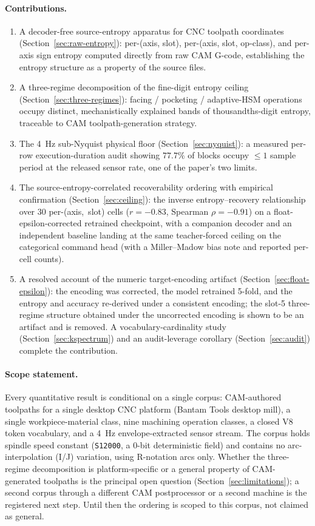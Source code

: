 \documentclass[entropy,article,submit,moreauthors,pdftex]{Definitions/mdpi}
\begin{document}
\paragraph{Contributions.}
\begin{enumerate}[label=\textbf{(\arabic*)}, leftmargin=*]
\item A decoder-free source-entropy apparatus for CNC toolpath coordinates (Section~\ref{sec:raw-entropy}): per-(axis, slot), per-(axis, slot, op-class), and per-axis sign entropy computed directly from raw CAM G-code, establishing the entropy structure as a property of the source files.
\item A three-regime decomposition of the fine-digit entropy ceiling (Section~\ref{sec:three-regimes}): facing / pocketing / adaptive-HSM operations occupy distinct, mechanistically explained bands of thousandths-digit entropy, traceable to CAM toolpath-generation strategy.
\item The 4~Hz sub-Nyquist physical floor (Section~\ref{sec:nyquist}): a measured per-row execution-duration audit showing $77.7\%$ of blocks occupy $\le\!1$ sample period at the released sensor rate, one of the paper's two limits.
\item The source-entropy-correlated recoverability ordering with empirical confirmation (Section~\ref{sec:ceiling}): the inverse entropy--recovery relationship over $30$ per-(axis,~slot) cells ($r=-0.83$, Spearman $\rho=-0.91$) on a float-epsilon-corrected retrained checkpoint, with a companion decoder and an independent baseline landing at the same teacher-forced ceiling on the categorical command head (with a Miller--Madow bias note and reported per-cell counts).
\item A resolved account of the numeric target-encoding artifact (Section~\ref{sec:float-epsilon}): the encoding was corrected, the model retrained 5-fold, and the entropy and accuracy re-derived under a consistent encoding; the slot-5 three-regime structure obtained under the uncorrected encoding is shown to be an artifact and is removed. A vocabulary-cardinality study (Section~\ref{sec:kspectrum}) and an audit-leverage corollary (Section~\ref{sec:audit}) complete the contribution.
\end{enumerate}

\paragraph{Scope statement.} Every quantitative result is conditional on a single corpus: CAM-authored toolpaths for a single desktop CNC platform (Bantam Tools desktop mill), a single workpiece-material class, nine machining operation classes, a closed V8 token vocabulary, and a 4~Hz envelope-extracted sensor stream. The corpus holds spindle speed constant (\texttt{S12000}, a $0$-bit deterministic field) and contains no arc-interpolation (I/J) variation, using R-notation arcs only. Whether the three-regime decomposition is platform-specific or a general property of CAM-generated toolpaths is the principal open question (Section~\ref{sec:limitations}); a second corpus through a different CAM postprocessor or a second machine is the registered next step. Until then the ordering is scoped to this corpus, not claimed as general.
\end{document}
